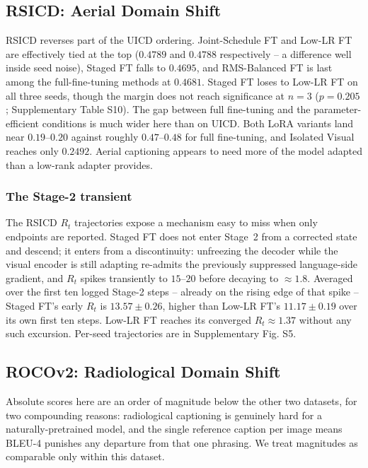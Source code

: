 \documentclass[journal]{IEEEtran}
\begin{document}
\subsection{RSICD: Aerial Domain Shift}
\label{sec:rsicd-results}
RSICD reverses part of the UICD ordering. Joint-Schedule FT and
Low-LR FT are effectively tied at the top ($0.4789$ and $0.4788$
respectively -- a difference well inside seed noise), Staged FT
falls to $0.4695$, and RMS-Balanced FT is last among the
full-fine-tuning methods at $0.4681$. Staged FT loses to Low-LR
FT on all three seeds, though the margin does not reach
significance at $n{=}3$ ($p{=}0.205$; Supplementary Table S10).
The gap between full fine-tuning and the parameter-efficient
conditions is much wider here than on UICD. Both LoRA variants
land near $0.19$--$0.20$ against roughly $0.47$--$0.48$ for full
fine-tuning, and Isolated Visual reaches only $0.2492$. Aerial
captioning appears to need more of the model adapted than a low-rank adapter provides.

\subsubsection{The Stage-2 transient}
The RSICD $R_t$ trajectories expose a mechanism easy to miss when only endpoints are reported. Staged FT does not enter Stage~2 from a corrected state and descend; it enters from a discontinuity: unfreezing the decoder while the visual encoder is
still adapting re-admits the previously suppressed language-side
gradient, and $R_t$ spikes transiently to $15$--$20$ before
decaying to $\approx 1.8$. Averaged over the first ten logged
Stage-2 steps -- already on the rising edge of that spike --
Staged FT's early $R_t$ is $13.57 \pm 0.26$, higher than Low-LR
FT's $11.17 \pm 0.19$ over its own first ten steps. Low-LR FT
reaches its converged $R_t \approx 1.37$ without any such
excursion. Per-seed trajectories are in Supplementary Fig. S5.

\subsection{ROCOv2: Radiological Domain Shift}
\label{sec:rocov2-results}
Absolute scores here are an order of magnitude below the other two
datasets, for two compounding reasons: radiological captioning is
genuinely hard for a naturally-pretrained model, and the single
reference caption per image means BLEU-4 punishes any departure from that one phrasing. We treat magnitudes as comparable only within this dataset.
\end{document}
